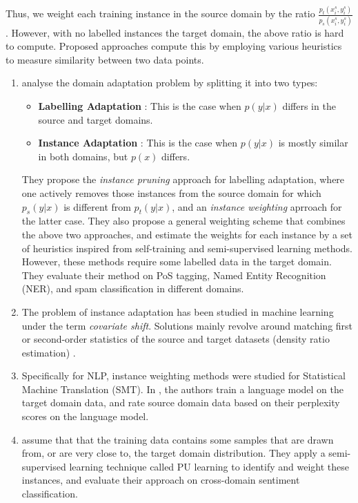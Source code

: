 \documentclass[12pt]{report}
\begin{document}
	Thus, we weight each training instance in the source domain by the ratio $\frac{p_{t}(x_{i}^{s},y_{i}^{s})}{p_{s}(x_{i}^{s},y_{i}^{s})}$. However, with no labelled instances the target domain, the above ratio is hard to compute. Proposed approaches compute this by employing various heuristics to measure similarity between two data points. \\
	\begin{enumerate}
		\item \citep{jiang2007instance} analyse the domain adaptation problem by splitting it into two types:
		\begin{itemize}
			\item \textbf{Labelling Adaptation} : This is the case when $p(y|x)$ differs in the source and target domains.
			\item \textbf{Instance Adaptation} : This is the case when $p(y|x)$ is mostly similar in both domains, but $p(x)$ differs. 
		\end{itemize}
		They propose the \textit{instance pruning} approach for labelling adaptation, where one actively removes those instances from the source domain for which $p_{s}(y|x)$ is different from $p_{t}(y|x)$, and an \textit{instance weighting} aprroach for the latter case. They also propose a general weighting scheme that combines the above two approaches, and estimate the weights for each instance by a set of heuristics inspired from self-training and semi-supervised learning methods. However, these methods require some labelled data in the target domain. They evaluate their method on PoS tagging, Named Entity Recognition (NER), and spam classification in different domains.
		
		\item The problem of instance adaptation has been studied in machine learning under the term \textit{covariate shift}. Solutions mainly revolve around matching first or second-order statistics of the source and target datasets (density ratio estimation) \citep{bickel2009discriminative}. 
		\item Specifically for NLP, instance weighting methods were studied for Statistical Machine Translation (SMT). In \citep{axelrod2011domain}, the authors train a language model on the target domain data, and rate source domain data based on their perplexity scores on the language model.
		\item \citep{xia2013instance} assume that that the training data contains some samples that are drawn from, or are very close to, the target domain distribution. They apply a semi-supervised learning technique called PU learning to identify and weight these instances, and evaluate their approach on cross-domain sentiment classification.
	\end{enumerate}
	
\end{document}
